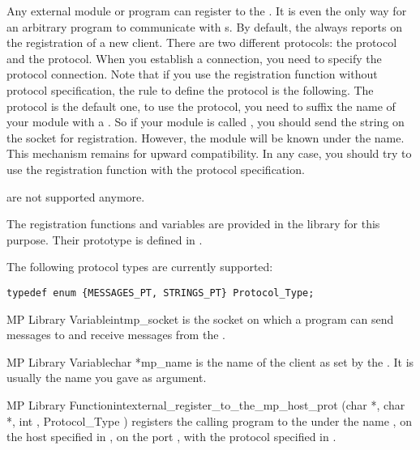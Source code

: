 Any external module or program can register to the \MPA{}. It is even the only
way for an arbitrary program to communicate with \CPK{}s. By default, the \MPA{}
always reports on  the registration of a new client. There are two
different protocols: the  protocol and the 
protocol. When you establish a connection, you need to specify the protocol
connection. Note that if you use the registration function without protocol
specification, the rule to define the protocol is the following. The
 protocol is the default one, to use the 
protocol, you need to suffix the name of your module with a \samp{/}. So if
your module is called , you should send the string  on the
socket for registration. However, the module will be known under the 
name. This mechanism remains for upward compatibility. In any case, you should
try to use the registration function with the protocol specification.

are not supported anymore.

The registration functions and variables are provided in the
 library for this purpose. Their prototype is defined in
.

The following protocol types are currently supported: 
\begin{verbatim}
typedef enum {MESSAGES_PT, STRINGS_PT} Protocol_Type;
\end{verbatim}

\begin{typevr}{MP Library Variable}{int}{mp\_socket}
is the \MPA{} socket on which a program can send messages to and receive
messages from the \MPA{}.
\end{typevr}


\begin{typevr}{MP Library Variable}{char *}{mp\_name}
is the name of the client as set by the \MPA{}. It is usually the name you gave
as argument.
\end{typevr}

\begin{typefn}{MP Library Function}{int}{external\_register\_to\_the\_mp\_host\_prot}
        {(char *, char *, int ,
Protocol\_Type )} registers the calling program to the \MPA{} under the
name , on the host specified in , on the port
, with the protocol specified in .
\end{typefn}

